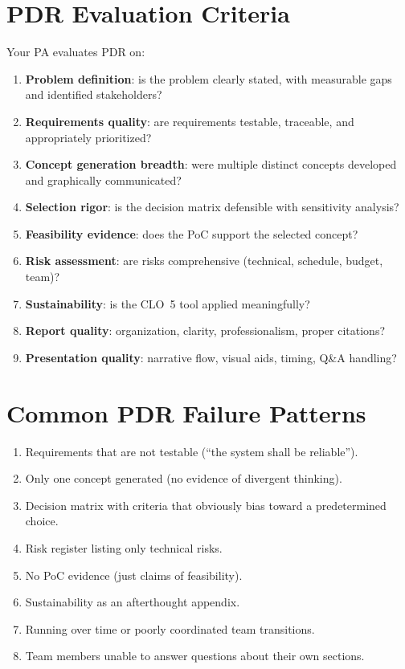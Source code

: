 \section{PDR Evaluation Criteria}
Your PA evaluates PDR on:
\begin{enumerate}[nosep,leftmargin=1.5em]
\item \textbf{Problem definition}: is the problem clearly stated, with measurable gaps and identified stakeholders?
\item \textbf{Requirements quality}: are requirements testable, traceable, and appropriately prioritized?
\item \textbf{Concept generation breadth}: were multiple distinct concepts developed and graphically communicated?
\item \textbf{Selection rigor}: is the decision matrix defensible with sensitivity analysis?
\item \textbf{Feasibility evidence}: does the PoC support the selected concept?
\item \textbf{Risk assessment}: are risks comprehensive (technical, schedule, budget, team)?
\item \textbf{Sustainability}: is the CLO~5 tool applied meaningfully?
\item \textbf{Report quality}: organization, clarity, professionalism, proper citations?
\item \textbf{Presentation quality}: narrative flow, visual aids, timing, Q\&A handling?
\end{enumerate}

\section{Common PDR Failure Patterns}
\begin{enumerate}[nosep,leftmargin=1.5em]
\item Requirements that are not testable (``the system shall be reliable'').
\item Only one concept generated (no evidence of divergent thinking).
\item Decision matrix with criteria that obviously bias toward a predetermined choice.
\item Risk register listing only technical risks.
\item No PoC evidence (just claims of feasibility).
\item Sustainability as an afterthought appendix.
\item Running over time or poorly coordinated team transitions.
\item Team members unable to answer questions about their own sections.
\end{enumerate}

